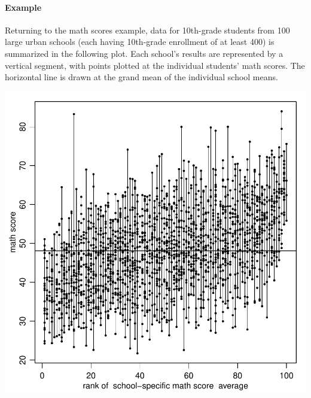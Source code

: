 \documentclass[12pt, a4paper]{article}
\begin{document}
      \paragraph{Example}
      Returning to the math scores example, data for 10th-grade students from 100 large urban schools (each having 10th-grade enrollment of at least 400) is summarized in the following plot. Each school's results are represented by a vertical segment, with points plotted at the individual students' math scores. The horizontal line is drawn at the grand mean of the individual school means.

\includegraphics{Thesis_v3-008}



%

\end{document}

